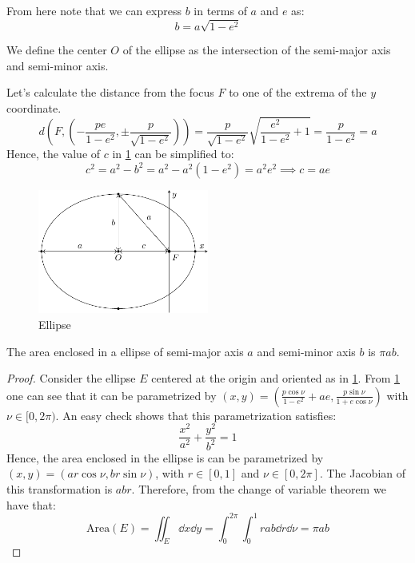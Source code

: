 \documentclass[../main.tex]{subfiles}
\begin{document}
From here note that we can express $b$ in terms of $a$ and $e$ as:
\begin{equation}\label{eq:ellipse_b_a}
  b=a\sqrt{1-e^2}
\end{equation}
\begin{definition}
  We define the center $O$ of the ellipse as the intersection of the semi-major axis and semi-minor axis.
\end{definition}
Let's calculate the distance from the focus $F$ to one of the extrema of the $y$ coordinate.
\begin{equation}
  d\left(F,\left(-\frac{pe}{1-e^2},\pm \frac{p}{\sqrt{1-e^2}}\right)\right)=\frac{p}{\sqrt{1-e^2}}\sqrt{\frac{e^2}{1-e^2}+1}=\frac{p}{1-e^2}=a
\end{equation}
Hence, the value of $c$ in \cref{fig:ellipse} can be simplified to:
\begin{equation}
  c^2=a^2-b^2=a^2-a^2(1-e^2)=a^2e^2\implies c=ae
\end{equation}
\begin{figure}
  \centering
  \includegraphics[width=0.5\textwidth]{Images/ellipse.pdf}
  \caption{Ellipse}
  \label{fig:ellipse}
\end{figure}
\begin{proposition}
  The area enclosed in a ellipse of semi-major axis $a$ and semi-minor axis $b$ is $\pi a b$.
\end{proposition}
\begin{proof}
  Consider the ellipse $E$ centered at the origin and oriented as in \cref{fig:ellipse}. From \cref{fig:ellipse} one can see that it can be parametrized by $(x,y)=(\frac{p\cos\nu}{1-e^2}+ae,\frac{p\sin\nu}{1+e\cos\nu})$ with $\nu\in[0,2\pi)$. An easy check shows that this parametrization satisfies:
  \begin{equation}
    \frac{x^2}{a^2}+\frac{y^2}{b^2}=1
  \end{equation}
  Hence, the area enclosed in the ellipse is can be parametrized by $(x, y)=(ar\cos\nu,br\sin\nu)$, with $r\in[0,1]$ and $\nu\in[0,2\pi]$. The Jacobian of this transformation is $abr$. Therefore, from the change of variable theorem we have that:
  \begin{equation}
    \mathrm{Area}(E)=\iint_E\dd{x}\dd{y}=\int_{0}^{2\pi}\int_{0}^{1}rab\dd{r}\dd\nu=\pi ab
  \end{equation}
\end{proof}
\end{document}
